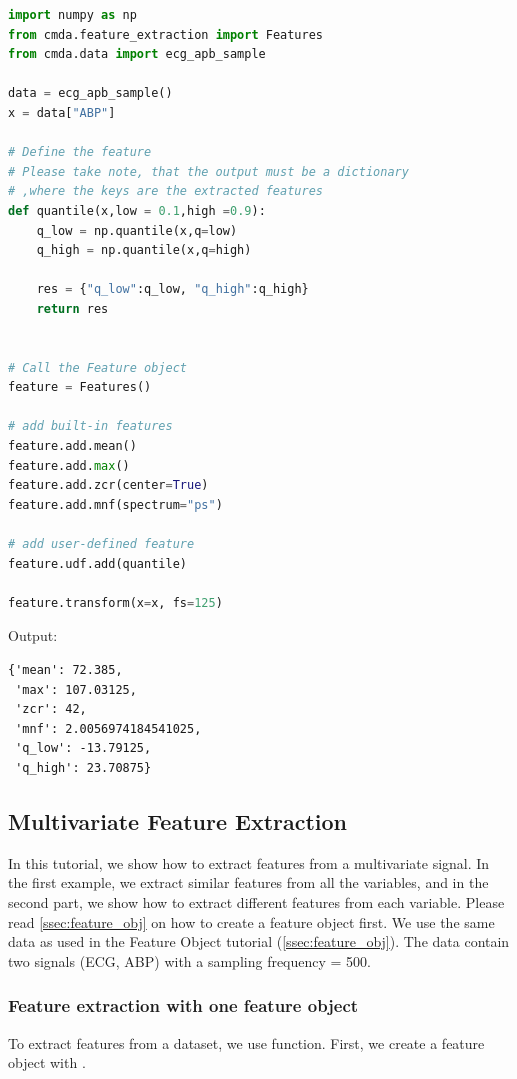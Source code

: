 \documentclass{article}
\begin{document}
\begin{lstlisting}[language=Python, caption=User-defined feature extraction]
import numpy as np
from cmda.feature_extraction import Features
from cmda.data import ecg_apb_sample

data = ecg_apb_sample()
x = data["ABP"]

# Define the feature
# Please take note, that the output must be a dictionary
# ,where the keys are the extracted features
def quantile(x,low = 0.1,high =0.9):
    q_low = np.quantile(x,q=low)
    q_high = np.quantile(x,q=high)
    
    res = {"q_low":q_low, "q_high":q_high}
    return res


# Call the Feature object
feature = Features()

# add built-in features
feature.add.mean()
feature.add.max()
feature.add.zcr(center=True)
feature.add.mnf(spectrum="ps")

# add user-defined feature
feature.udf.add(quantile)

feature.transform(x=x, fs=125)
\end{lstlisting}

Output:
\begin{lstlisting}[caption=User-defined feature extraction output]
{'mean': 72.385,
 'max': 107.03125,
 'zcr': 42,
 'mnf': 2.0056974184541025,
 'q_low': -13.79125,
 'q_high': 23.70875}
\end{lstlisting}

\subsection{Multivariate Feature Extraction}

In this tutorial, we show how to extract features from a multivariate signal. In the first example, we extract similar features from all the variables, and in the second part, we show how to extract different features from each variable. Please read \ref{ssec:feature_obj} on how to create a feature object first. We use the same data as used in the Feature Object tutorial (\ref{ssec:feature_obj}). The data contain two signals (ECG, ABP) with a sampling frequency = 500.

\subsubsection{Feature extraction with one feature object}
To extract features from a dataset, we use  function. First, we create a feature object with .
\end{document}

